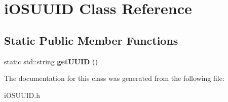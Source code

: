 \hypertarget{classi_o_s_u_u_i_d}{}\section{i\+O\+S\+U\+U\+ID Class Reference}
\label{classi_o_s_u_u_i_d}
\subsection*{Static Public Member Functions}
\begin{DoxyCompactItemize}
\item 
\mbox{\label{classi_o_s_u_u_i_d_a476020f3f3596ff1ee8a16ab1cf38c73}} 
static std\+::string {\bfseries get\+U\+U\+ID} ()
\end{DoxyCompactItemize}


The documentation for this class was generated from the following file\+:\begin{DoxyCompactItemize}
\item 
i\+O\+S\+U\+U\+I\+D.\+h\end{DoxyCompactItemize}
